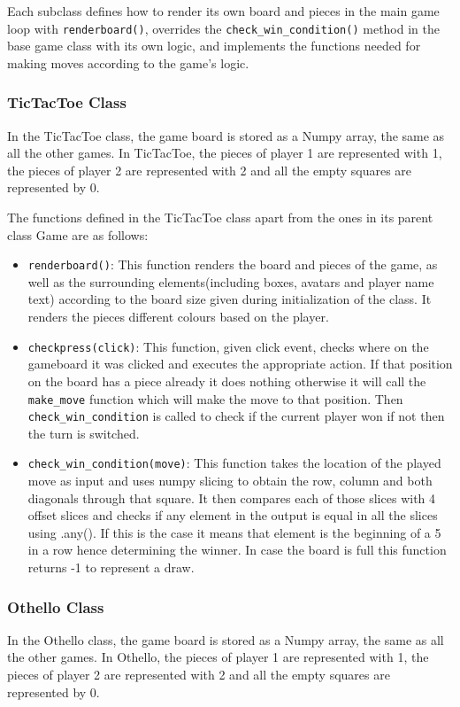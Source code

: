 \documentclass[12pt, letter]{article}
\begin{document}
Each subclass defines how to render its own board and pieces in the main game loop with \texttt{renderboard()}, overrides the \texttt{check\_win\_condition()} method in the base game class with its own logic, and implements the functions needed for making moves according to the game's logic.

\subsubsection{TicTacToe Class}
In the TicTacToe class, the game board is stored as a Numpy array, the same as all the other games. In TicTacToe, the pieces of player 1 are represented with 1, the pieces of player 2 are represented with 2 and all the empty squares are represented by 0.

The functions defined in the TicTacToe class apart from the ones in its parent class Game are as follows:
\begin{itemize}
    \item \texttt{renderboard()}: This function renders the board and pieces of the game, as well as the surrounding elements(including boxes, avatars and player name text) according to the board size given during initialization of the class. It renders the pieces different colours based on the player.
    \item \texttt{checkpress(click)}: This function, given click event, checks where on the gameboard it was clicked and executes the appropriate action. If that position on the board has a piece already it does nothing otherwise  it will call the \texttt{make\_move} function which will make the move to that position. Then \texttt{check\_win\_condition} is called to check if the current player won if not then the turn is switched.
    \item \texttt{check\_win\_condition(move)}: This function takes the location of the played move as input and uses numpy slicing to obtain the row, column and both diagonals through that square. It then compares each of those slices with 4 offset slices and checks if any element in the output is equal in all the slices using .any(). If this is the case it means that element is the beginning of a 5 in a row hence determining the winner. In case the board is full this function returns -1 to represent a draw.
\end{itemize}
\subsubsection{Othello Class}
In the Othello class, the game board is stored as a Numpy array, the same as all the other games. In Othello, the pieces of player 1 are represented with 1, the pieces of player 2 are represented with 2 and all the empty squares are represented by 0.
\end{document}
